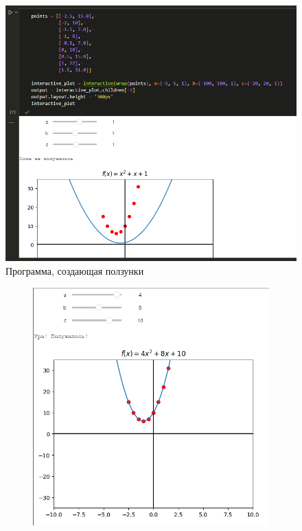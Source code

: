 \documentclass[14pt,a4paper]{extarticle}
\begin{document}
\begin{figure}[h!]
    \centering
    \includegraphics[width=0.4\linewidth]{figures/2.1.png}
    \caption{Программа, создающая ползунки}
    \label{fig:2.1-interactive}
\end{figure}

\begin{figure}[h!]
    \begin{subfigure}{.5\textwidth}
        \centering
        \includegraphics[width=0.9\linewidth]{figures/2.1-first.png}
    \end{subfigure}%
    \begin{subfigure}{.5\textwidth}
        \centering

\end{subfigure}
\end{figure}
\end{document}
